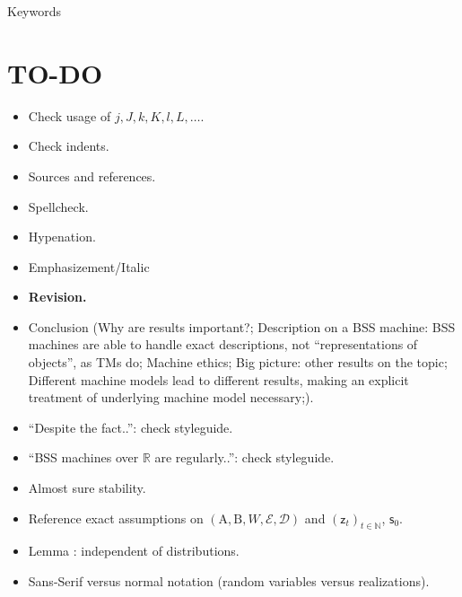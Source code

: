 \documentclass[conference]{IEEEtran}
\newcommand{\rs}{\mathsf{s}}
\newcommand{\rz}{\mathsf{z}}
\def\E{{\mathcal E}}
\def\D{{\mathcal D}}
\def\NN{{\mathbb N}}
\def\RR{{\mathbb R}}
\def\mA{\bm{\mathrm{A}}}
\def\mB{\bm{\mathrm{B}}}
\begin{document}
\begin{IEEEkeywords}
	\color{red} Keywords
\end{IEEEkeywords}

\section{TO-DO}
	\begin{itemize}
		\item Check usage of \(j,J,k,K,l,L,\ldots\).
		\item Check indents.
		\item Sources and references.
		\item Spellcheck.
		\item Hypenation.
		\item Emphasizement/Italic
		\item \textbf{Revision.}
		\item Conclusion (Why are results important?; Description on a BSS machine: BSS machines are able to handle exact descriptions, not ``representations of objects'',
				as TMs do; Machine ethics; Big picture: other results on the topic; Different machine models lead to different results, making an explicit treatment of underlying
				machine model necessary;).
		\item ``Despite the fact..'': check styleguide.
		\item ``BSS machines over \(\RR\) are regularly..'': check styleguide.
		\item Almost sure stability.
		\item Reference exact assumptions on \((\mA,\mB,W,\E,\D)\) and \((\rz_t)_{t\in\NN}\), \(\rs_{0}\).
		\item Lemma \label{lem:SolvabilityCondition}: independent of distributions.
		\item Sans-Serif versus normal notation (random variables versus realizations).
	\end{itemize}
\end{document}
